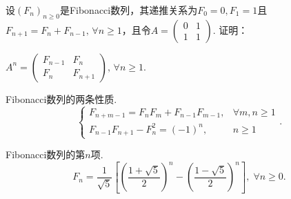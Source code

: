 \begin{mybox}
  \begin{problem}[另一个Fibonacci矩阵]

    设$(F_n)_{n\ge0}$是Fibonacci数列，其递推关系为$F_0=0,F_1=1$且$F_{n+1}=F_n+F_{n-1},\,\forall n\ge1$，且令$A=\begin{pmatrix}
      0 & 1 \\
      1 & 1
    \end{pmatrix}$. 证明：
    \begin{enum}
      \item $A^n=\begin{pmatrix}
        F_{n-1} & F_n \\
        F_n & F_{n+1}
      \end{pmatrix},\,\forall n\ge1$.
      \item {\kaishu Fibonacci数列的两条性质.}
      \[
        \begin{cases}
            F_{n+m-1} = F_nF_m + F_{n-1}F_{m-1}, &\forall m,n\ge1 \\
            F_{n-1}F_{n+1} - F_n^2 = (-1)^n, & n\ge1
          \end{cases}.
      \]
      \item \label{prob3.24c}{\kaishu Fibonacci数列的第$n$项.}
      \[
        F_n = \frac1{\sqrt5} \left[
          \left( \frac{1 + \sqrt5}2 \right)^n -
          \left( \frac{1 - \sqrt5}2 \right)^n
        \right],\; \forall n\ge0.
      \]
    \end{enum}
  \end{problem}
\end{mybox}

